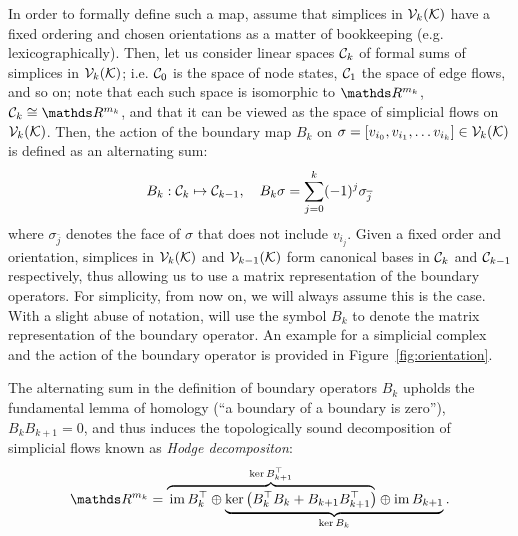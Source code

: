 In order to formally define such a map, assume that simplices in \( \mathcal{V}_{k}(\mathcal{K}) \) have a fixed ordering and chosen orientations as a matter of bookkeeping (e.g. lexicographically). Then, let us consider linear spaces \( \mathcal{C}_k\) of formal sums of simplices in \( \mathcal{V}_{k}(\mathcal{K}) \); i.e. \( \mathcal{C}_0 \) is the space of node states, \( \mathcal{C}_1 \) the space of edge flows, and so on; note that each such space is isomorphic to $\ds R^{m_k}$, \( \mc C_k \cong \ds R^{m_k} \),  and that it can be viewed as the space of simplicial flows on \( \mathcal{V}_{k}(\mathcal{K})\). Then, the action of the boundary map \( B_k\) on \( \sigma = [ v_{i_0}, v_{i_1}, \dots v_{i_k} ] \in \mathcal{V}_{k}(\mathcal{K}) \) is defined as an alternating sum:
\begin{equation*}
      B_k : \mathcal{C}_k \mapsto \mathcal{C}_{k-1}, \quad B_k \sigma = \sum_{j=0}^{k} (-1)^j \sigma_{\overline{j} }
\end{equation*}
where \( \sigma_{\bar j } \) denotes the face of \( \sigma \) that does not include \( v_{i_j}\). Given a fixed order and orientation, simplices in \( \mathcal{V}_{k}(\mathcal{K}) \) and \( \mathcal{V}_{k-1}(\mathcal{K})\) form canonical bases in \( \mathcal{C}_k\) and \( \mathcal{C}_{k-1}\) respectively, thus allowing us to use a matrix representation of the boundary operators. For simplicity, from now on, we will always assume this is the case. With a slight abuse of notation, will use the symbol \( B_k \) to denote the matrix representation of the boundary operator. An example for a simplicial complex and the action of the boundary operator is provided in Figure~\ref{fig:orientation}. 


The alternating sum in the definition of boundary operators \( B_k \) upholds the fundamental lemma of homology (``a boundary of a boundary is zero''), \( B_k B_{ k + 1 } = 0 \), and thus induces the topologically sound decomposition of simplicial flows known as \emph{Hodge decompositon}:
\begin{equation}
      \label{eq:hodge_decomposition}
      \ds R^{m_k} = \lefteqn{\overbrace{\phantom{\im B_k^\top \oplus  \ker \left( B_k^\top B_k + B_{k+1} B_{k+1}^\top \right)}}^{\ker B_{k+1}^\top}} \im B_k^\top \oplus
      \underbrace{\ker \left( B_k^\top B_k + B_{k+1} B_{k+1}^\top \right) \oplus  \im B_{k+1}}_{\ker B_k}.          
\end{equation}


